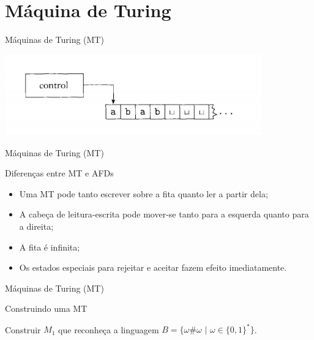\documentclass[xcolor=dvipsnames,table]{beamer}
\begin{document}
	\section{Máquina de Turing}	
	\begin{frame}{Máquinas de Turing (MT)}
		\begin{center}
			\includegraphics[height=3.5cm]{images/fig31.png}
		\end{center}
	\end{frame}
	
	\begin{frame}{Máquinas de Turing (MT)}
		\begin{block}{Diferenças entre MT e AFDs}
			\begin{itemize}
				\item Uma MT pode tanto escrever sobre a fita quanto ler a partir dela; \pause
				\item A cabeça de leitura-escrita pode mover-se tanto para a esquerda quanto para a direita; \pause
				\item A fita é infinita; \pause
				\item Os estados especiais para rejeitar e aceitar fazem efeito imediatamente.
			\end{itemize}
		\end{block}
	\end{frame}
	
	\begin{frame}{Máquinas de Turing (MT)}
		\begin{block}{Construindo uma MT}
			\begin{center}
				Construir $M_1$ que reconheça a linguagem $B = \{ \omega \# \omega \mbox{ | } \omega \in \{ 0, 1 \}^* \}$.
			\end{center}
		\end{block}
	\end{frame}
	
\end{document}
